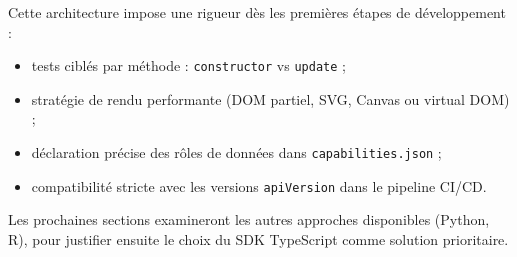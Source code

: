 Cette architecture impose une rigueur dès les premières étapes de développement :

\begin{itemize}
  \item tests ciblés par méthode : \texttt{constructor} vs \texttt{update} ;
  \item stratégie de rendu performante (DOM partiel, SVG, Canvas ou virtual DOM) ;
  \item déclaration précise des rôles de données dans \texttt{capabilities.json} ;
  \item compatibilité stricte avec les versions \texttt{apiVersion} dans le pipeline CI/CD.
\end{itemize}

Les prochaines sections examineront les autres approches disponibles (Python, R), pour justifier ensuite le choix du SDK TypeScript comme solution prioritaire.

